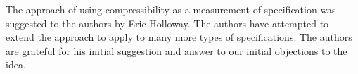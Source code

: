 %


The approach of using compressibility as a measurement of specification was suggested to the authors by Eric Holloway.
The authors have attempted to extend the approach to apply to many more types of specifications.
The authors are grateful for his initial suggestion and answer to our initial objections to the idea.

